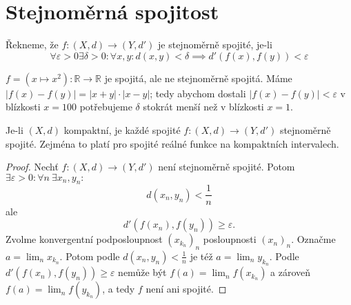 \documentclass[../main.tex]{subfiles}
\begin{document}
\section{Stejnoměrná spojitost}
\begin{definition}
	Řekneme, že $f : (X,d) \rightarrow (Y,d')$ je stejnoměrně spojité, je-li
	\[\forall \varepsilon > 0 \exists \delta > 0 : \forall x,y : d(x,y) < \delta \implies d'(f(x),f(y)) < \varepsilon\]
\end{definition}

\begin{example}
	$f = (x \mapsto x^2) : \mathbb{R} \rightarrow \mathbb{R}$ je spojitá, ale ne stejnoměrně spojitá.
	Máme $|f(x) - f(y)| = |x+y| \cdot |x-y|$; tedy abychom dostali $|f(x)-f(y)| < \varepsilon $ v 
	blízkosti $x = 100$ potřebujeme $\delta$ stokrát menší než v blízkosti $x = 1$.
\end{example}

\begin{theorem}
	Je-li $(X,d)$ kompaktní, je každé spojité $f : (X,d) \rightarrow (Y,d')$ stejnoměrně spojité. Zejména to platí 
	pro spojité reálné funkce na kompaktních intervalech.
\end{theorem}

\begin{proof}
	Nechť $f : (X,d) \rightarrow (Y,d')$ není stejnoměrně spojité. Potom $\exists \varepsilon > 0 : \forall n\ \exists x_n, y_n :$
	\[d(x_n,y_n) < \frac{1}{n}\]
	ale
	\[d'(f(x_n),f(y_n)) \geq \varepsilon.\]
	Zvolme konvergentní podposloupnost $(x_{k_n})_n$ posloupnosti $(x_n)_n$. Označme $a = \lim_n x_{k_n}.$ Potom podle $d(x_n,y_n) < \frac{1}{n}$ je též 
	$a = \lim_n y_{k_n}.$ Podle $d'(f(x_n),f(y_n)) \geq \varepsilon$ nemůže být $f(a) = \lim_n f(x_{k_n})$ a zároveň $f(a) = \lim_n f(y_{k_n})$, 
	a tedy $f$ není ani spojité.
\end{proof}
\end{document}
